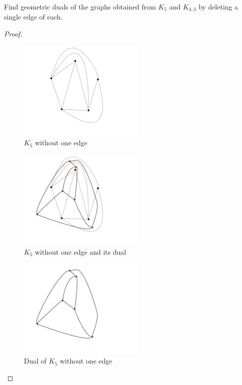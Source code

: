 \prob
{
    Find geometric duals of the graphs obtained from $K_5$ and $K_{3,3}$ by
    deleting a single edge of each.
}
\begin{proof}$\,$\pn
    \begin{figure}[H]
        \begin{center}
        \includegraphics[width=6cm]{Test2/Problem9/PlanarK5WithoutOneEdge.png}
        \end{center}                            
        \caption{$K_5$ without one edge}
        \label{t2:p9_PlanarK5WithoutOneEdge.png}                        
    \end{figure}\pn   
    
    \begin{figure}[H]
        \begin{center}
        \includegraphics[width=6cm]{Test2/Problem9/PlanarK5WithoutOneEdge_and_dual.png}
        \end{center}                            
        \caption{$K_5$ without one edge and its dual}
        \label{t2:p9_PlanarK5WithoutOneEdge_and_dual.png}                        
    \end{figure}\pn   
    
    \begin{figure}[H]
        \begin{center}
        \includegraphics[width=6cm]{Test2/Problem9/PlanarK5WithoutOneEdge_Dual.png}
        \end{center}                            
        \caption{Dual of $K_5$ without one edge}
        \label{t2:p9_PlanarK5WithoutOneEdge_Dual.png}                        
    \end{figure}\pn    
    

\end{proof}

